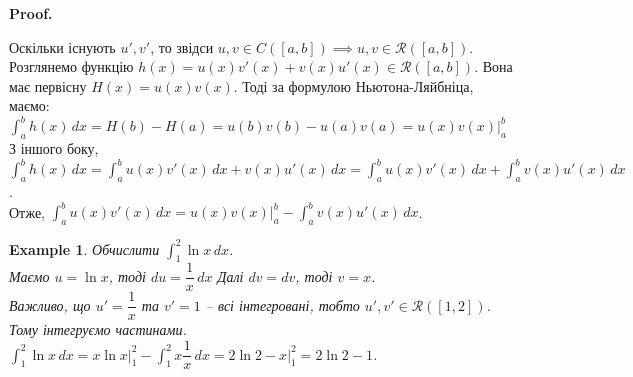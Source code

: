 \documentclass[a4paper, 10pt]{article}
\makeatletter
\def\huge{\displaystyle}
\theoremstyle{theoremdd}
\theoremstyle{theoremdd}
\theoremstyle{theoremdd}
\theoremstyle{theoremdd}
\theoremstyle{theoremdd}
\newtheorem{example}[theorem]{Example}
\theoremstyle{theoremdd}
\theoremstyle{theoremdd}
\theoremstyle{theoremdd}
\theoremstyle{theoremdd}
\renewenvironment{proof}[1][Proof.\\]{\par
\pushQED{\hfill \qed}%
\normalfont \topsep6\p@\@plus6\p@\relax
\trivlist
\item\relax
{\bfseries
#1\@addpunct{.}}\hspace\labelsep\ignorespaces
}{%
\popQED\endtrivlist\@endpefalse
}
\makeatother
\begin{document}
\begin{proof}
Оскільки існують $u',v'$, то звідси $u,v \in C([a,b]) \implies u,v \in \mathcal{R}([a,b])$.\\
Розглянемо функцію $h(x) = u(x)v'(x) + v(x)u'(x) \in \mathcal{R}([a,b])$. Вона має первісну $H(x) = u(x)v(x)$. Тоді за формулою Ньютона-Ляйбніца, маємо:\\
$\huge\int_a^b h(x)\,dx = H(b)-H(a) = u(b)v(b) - u(a)v(a) = u(x)v(x) \Big|_a^b$\\
З іншого боку, $\huge\int_a^b h(x)\,dx = \int_a^b u(x)v'(x)\,dx + v(x)u'(x)\,dx = \int_a^b u(x)v'(x)\,dx + \int_a^b v(x)u'(x)\,dx$.\\
Отже, $\huge\int_a^b u(x)v'(x)\,dx = u(x)v(x) \Big|_{a}^{b} - \int_a^b v(x)u'(x)\,dx$.
\end{proof}

\begin{example}
Обчислити $\huge\int_1^2 \ln x \,dx$.\\
Маємо $u = \ln x$, тоді $du = \dfrac{1}{x}\,dx$ \hspace{1cm} Далі $dv = dv$, тоді $v = x$.\\
Важливо, що $u' = \dfrac{1}{x}$ та $v' = 1$ -- всі інтегровані, тобто $u',v' \in \mathcal{R}([1,2])$. Тому інтегруємо частинами.\\
$\huge\int_1^2 \ln x \,dx = x \ln x \Big|_1^2 - \int_1^2 x \dfrac{1}{x}\,dx = 2 \ln 2 - x\Big|_1^2 = 2 \ln 2 - 1$.
\end{example}
\end{document}

